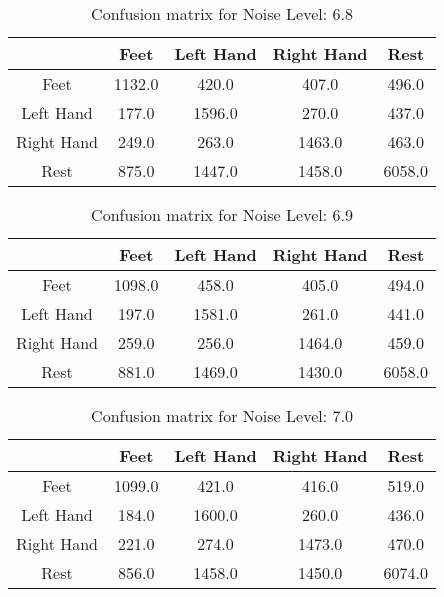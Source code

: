 \begin{table}[!htbp]
    \centering
    \begin{tabular}{|c||c|c|c|c|}
        \hline
		 & Feet & Left Hand & Right Hand & Rest \\
        \hline
        \hline
        Feet & 1132.0 & 420.0 & 407.0 & 496.0 \\
        \hline
        Left Hand & 177.0 & 1596.0 & 270.0 & 437.0 \\
        \hline
        Right Hand & 249.0 & 263.0 & 1463.0 & 463.0 \\
        \hline
        Rest & 875.0 & 1447.0 & 1458.0 & 6058.0 \\
        \hline
    \end{tabular}
    \caption{Confusion matrix for Noise Level: 6.8}
\end{table}

\begin{table}[!htbp]
    \centering
    \begin{tabular}{|c||c|c|c|c|}
        \hline
		 & Feet & Left Hand & Right Hand & Rest \\
        \hline
        \hline
        Feet & 1098.0 & 458.0 & 405.0 & 494.0 \\
        \hline
        Left Hand & 197.0 & 1581.0 & 261.0 & 441.0 \\
        \hline
        Right Hand & 259.0 & 256.0 & 1464.0 & 459.0 \\
        \hline
        Rest & 881.0 & 1469.0 & 1430.0 & 6058.0 \\
        \hline
    \end{tabular}
    \caption{Confusion matrix for Noise Level: 6.9}
\end{table}

\begin{table}[!htbp]
    \centering
    \begin{tabular}{|c||c|c|c|c|}
        \hline
		 & Feet & Left Hand & Right Hand & Rest \\
        \hline
        \hline
        Feet & 1099.0 & 421.0 & 416.0 & 519.0 \\
        \hline
        Left Hand & 184.0 & 1600.0 & 260.0 & 436.0 \\
        \hline
        Right Hand & 221.0 & 274.0 & 1473.0 & 470.0 \\
        \hline
        Rest & 856.0 & 1458.0 & 1450.0 & 6074.0 \\
        \hline
    \end{tabular}
    \caption{Confusion matrix for Noise Level: 7.0}
\end{table}

